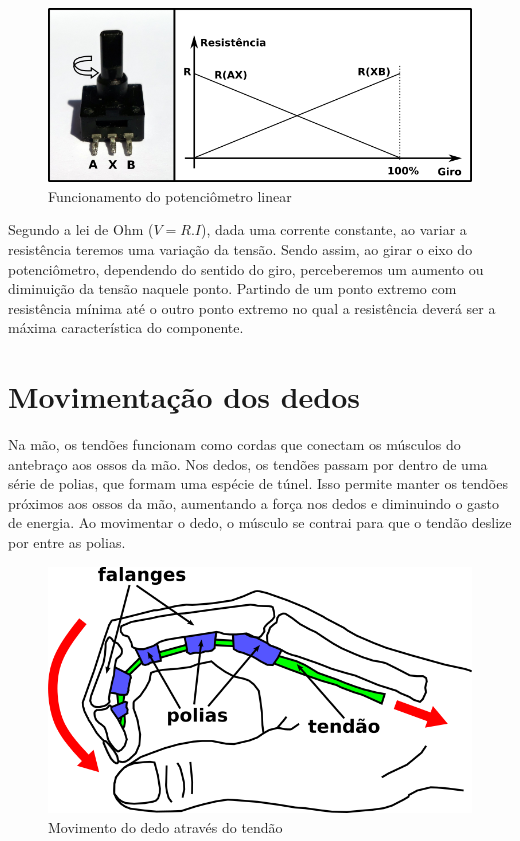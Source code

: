 \documentclass[
	12pt,				%
	openright,			%
	oneside,			%
	a4paper,			%
	english,			%
	brazil				%
	]{abntex2}
\begin{document}
		\begin{figure}[h!]
			\centering
  		\includegraphics[scale=0.7]{./figures/potentiometer1.png}
  		\caption{Funcionamento do potenciômetro linear}
  		\label{Fig:potentiometer1}
		\end{figure}

		Segundo a lei de Ohm ($V = R.I$), dada uma corrente constante, ao variar a resistência teremos uma variação da tensão. Sendo assim, ao girar o eixo do potenciômetro, dependendo do sentido do giro, perceberemos um aumento ou diminuição da tensão naquele ponto. Partindo de um ponto extremo com resistência mínima até o outro ponto extremo no qual a resistência deverá ser a máxima característica do componente.

		\section{Movimentação dos dedos}
		Na mão, os tendões funcionam como cordas que conectam os músculos do antebraço aos ossos da mão. Nos dedos, os tendões passam por dentro de uma série de polias, que formam uma espécie de túnel. Isso permite manter os tendões próximos aos ossos da mão, aumentando a força nos dedos e diminuindo o gasto de energia. Ao movimentar o dedo, o músculo se contrai para que o tendão deslize por entre as polias. \cite{drricardocirurgiao}
 
		\begin{figure}[h!]
			\centering
  		\includegraphics[scale=0.5]{./figures/hand-tendon-flex1.png}
  		\caption{Movimento do dedo através do tendão}
  		\label{Fig:hand-tendon-flex1}
		\end{figure}
\end{document}
